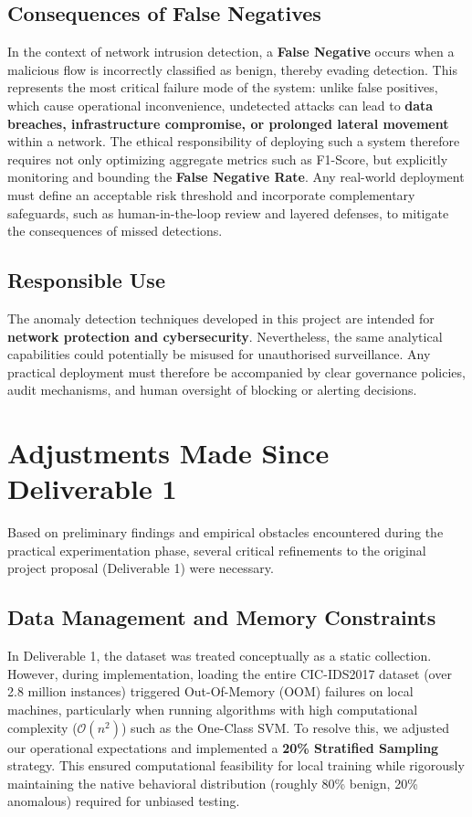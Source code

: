 \documentclass[11pt]{article}
\begin{document}
\subsection{Consequences of False Negatives}
In the context of network intrusion detection, a \textbf{False Negative} occurs when a malicious flow is incorrectly classified as benign, thereby evading detection. This represents the most critical failure mode of the system: unlike false positives, which cause operational inconvenience, undetected attacks can lead to \textbf{data breaches, infrastructure compromise, or prolonged lateral movement} within a network. The ethical responsibility of deploying such a system therefore requires not only optimizing aggregate metrics such as F1-Score, but explicitly monitoring and bounding the \textbf{False Negative Rate}. Any real-world deployment must define an acceptable risk threshold and incorporate complementary safeguards, such as human-in-the-loop review and layered defenses, to mitigate the consequences of missed detections.


\subsection{Responsible Use}
The anomaly detection techniques developed in this project are intended for \textbf{network protection and cybersecurity}. Nevertheless, the same analytical capabilities could potentially be misused for unauthorised surveillance. Any practical deployment must therefore be accompanied by clear governance policies, audit mechanisms, and human oversight of blocking or alerting decisions.

\section{Adjustments Made Since Deliverable 1}

Based on preliminary findings and empirical obstacles encountered during the practical experimentation phase, several critical refinements to the original project proposal (Deliverable 1) were necessary.

\subsection{Data Management and Memory Constraints}
In Deliverable 1, the dataset was treated conceptually as a static collection. However, during implementation, loading the entire CIC-IDS2017 dataset (over 2.8 million instances) triggered Out-Of-Memory (OOM) failures on local machines, particularly when running algorithms with high computational complexity ($\mathcal{O}(n^2)$) such as the One-Class SVM. To resolve this, we adjusted our operational expectations and implemented a \textbf{20\% Stratified Sampling} strategy. This ensured computational feasibility for local training while rigorously maintaining the native behavioral distribution (roughly 80\% benign, 20\% anomalous) required for unbiased testing.
\end{document}
